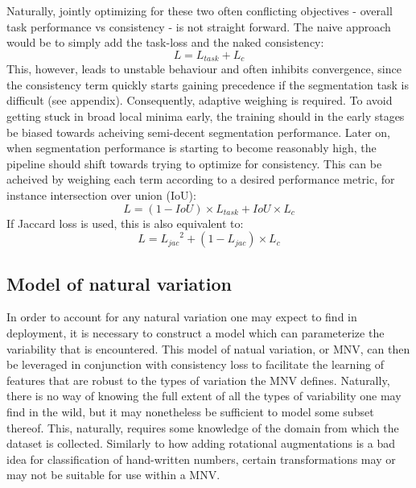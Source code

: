 	Naturally, jointly optimizing for these two often conflicting objectives - overall task performance vs consistency - is not straight forward. The naive approach would be to simply add the task-loss and the naked consistency:
    \begin{equation}
		L = L_{task} + L_c
	\end{equation}
	This, however, leads to unstable behaviour and often inhibits convergence, since the consistency term quickly starts gaining precedence if the segmentation task is difficult (see appendix). Consequently, adaptive weighing is required. To avoid getting stuck in broad local minima early, the training should in the early stages be biased towards acheiving semi-decent segmentation performance. Later on, when segmentation performance is starting to become reasonably high, the pipeline should shift towards trying to optimize for consistency. This can be acheived by weighing each term according to a desired performance metric, for instance intersection over union (IoU):
	\begin{equation}
		L = (1-IoU)\times L_{task} + IoU \times L_c
	\end{equation}
	If Jaccard loss is used, this is also equivalent to:
	\begin{equation}
		L = {L_{jac}}^2 + (1-L_{jac})\times L_c
	\end{equation}
	
  	\subsection{Model of natural variation}
  	In order to account for any natural variation one may expect to find in deployment, it is necessary to construct a model which can parameterize the variability that is encountered. This model of natual variation, or MNV, can then be leveraged in conjunction with consistency loss to facilitate the learning of features that are robust to the types of variation the MNV defines. Naturally, there is no way of knowing the full extent of all the types of variability one may find in the wild, but it may nonetheless be sufficient to model some subset thereof. This, naturally, requires some knowledge of the domain from which the dataset is collected. Similarly to how adding rotational augmentations is a bad idea for classification of hand-written numbers, certain transformations may or may not be suitable for use within a MNV.
  		
